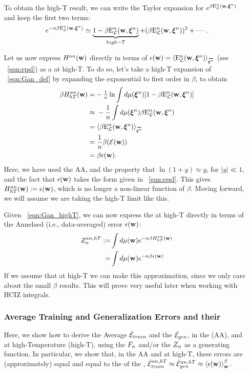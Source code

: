 To obtain the high-T result, we can write the Taylor expansion for $e^{\beta\mathbf{\mathrm{E}}^{n}_{\mathcal{L}}(\mathbf{w}, \boldsymbol{\xi}^{n})}$ and keep
the first two terms:
\begin{align}
  e^{-n\beta\mathbf{\mathrm{E}}^{n}_{\mathcal{L}}(\mathbf{w}, \boldsymbol{\xi}^{n})} \simeq \underbrace{1 - \beta\mathbf{\mathrm{E}}^{n}_{\mathcal{L}}(\mathbf{w}, \boldsymbol{\xi}^{n})}_{high-T}+ (\beta\mathbf{\mathrm{E}}^{n}_{\mathcal{L}}(\mathbf{w}, \boldsymbol{\xi}^{n}))^{2} + \cdots  .
\end{align}

Let us now express $H^{an}({\mathbf{w}})$ directly in terms of $\EPSLw=\langle\DETOPXI \rangle_{\AVGNDXIn}$ (see \EQN~\ref{eqn:epsl}) as a \ThermalAverage at high-T.
To do so, let's take a high-T expansion of \EQN~\ref{eqn:Gan_def} 
by expanding the exponential to first order in $\beta$, to obtain
\begin{align}
\beta\GANHT =&  - \tfrac{1}{\ND}\ln \int d\mu(\NDXIn) [1-\beta \DETOPXI] \nonumber \\
\approx&\;   - \frac{1}{\ND} \int d\mu(\NDXIn)\beta \DETOPXI \nonumber \\
=&\;\langle \beta\DETOPXI \rangle_{\AVGNDXIn} \nonumber \\
=&\;\frac{1}{\ND}\beta(\DETOT)  \nonumber \\
=&\;\beta \EPSLw  .
\label{eqn:Gan_highT}
\end{align}
Here, we have used the AA, and the property that $\ln(1 + y) \approx y$, for $|y| \ll 1$, and the fact that $\epsilon({\mathbf{w}})$ takes the form given in \EQN~\ref{eqn:epsl}.
This gives $H^{an}_{hT}({\mathbf{w}}):=\epsilon({\mathbf{w}})$, which is no longer a non-linear function of $\beta$.
Moving forward, we will assume we are taking the high-T limit like this.

Given \EQN~\ref{eqn:Gan_highT}, we can now express the \Annealed \PartitionFunction at high-T directly in terms of
the Annelaed (i.e., data-averaged) error $\epsilon({\mathbf{w}})$:
\begin{align}
  \nonumber
  \label{eqn:Zanht_def}
Z^{an,hT}_{n} :=  &\int d\mu({\mathbf{w}}) e^{-n\beta H^{an}_{hT}({\mathbf{w}})} \\ 
  =  &\int d\mu({\mathbf{w}}) e^{-n\beta\epsilon({\mathbf{w}})} 
\end{align}
If we assume that at high-T we can make this approximation, 
since we only care about the small $\beta$ results. 
This will prove very useful later when working with HCIZ integrals.


\subsubsection{Average Training and Generalization Errors and their \GeneratingFunctions}
\label{sxn:mathP_errors}
Here, we show how to derive the Average \TrainingError $\bar{\mathcal{E}}_{train}$ and  the \AverageGeneralizationError $\bar{\mathcal{E}}_{gen}$,
in the \AnnealedApproximation (AA), and at high-Temperature (high-T), using the \FreeEnergy $F_{n}$ and/or the \PartitionFunction $Z_{n}$ as
a generating function.  
In particular, we show that, in the AA and at high-T, these errors are (approximately) equal
and equal to the \ThermalAverage of the \EffectivePotential,
$\bar{\mathcal{E}}_{train}^{an, hT} \approx \bar{\mathcal{E}}_{gen}^{an, hT} \approx \left\langle \epsilon({\mathbf{w}}) \right\rangle_{\mathbf w}^{\beta}$.

